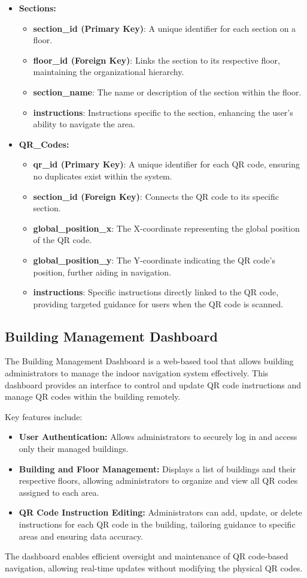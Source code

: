 \begin{itemize}
	\item \textbf{Sections:}  
	\begin{itemize}
		\item \textbf{section\_id (Primary Key)}: A unique identifier for each section on a floor.
		\item \textbf{floor\_id (Foreign Key)}: Links the section to its respective floor, maintaining the organizational hierarchy.
		\item \textbf{section\_name}: The name or description of the section within the floor.
		\item \textbf{instructions}: Instructions specific to the section, enhancing the user’s ability to navigate the area.
	\end{itemize}
	
	\item \textbf{QR\_Codes:}  
	\begin{itemize}
		\item \textbf{qr\_id (Primary Key)}: A unique identifier for each QR code, ensuring no duplicates exist within the system.
		\item \textbf{section\_id (Foreign Key)}: Connects the QR code to its specific section.
		\item \textbf{global\_position\_x}: The X-coordinate representing the global position of the QR code.
		\item \textbf{global\_position\_y}: The Y-coordinate indicating the QR code's position, further aiding in navigation.
		\item \textbf{instructions}: Specific instructions directly linked to the QR code, providing targeted guidance for users when the QR code is scanned.
	\end{itemize}
\end{itemize}


\subsection{Building Management Dashboard}

The Building Management Dashboard is a web-based tool that allows building administrators to manage the indoor navigation system effectively. This dashboard provides an interface to control and update QR code instructions and manage QR codes within the building remotely.

Key features include:
\begin{itemize}
	\item \textbf{User Authentication:} Allows administrators to securely log in and access only their managed buildings.
	\item \textbf{Building and Floor Management:} Displays a list of buildings and their respective floors, allowing administrators to organize and view all QR codes assigned to each area.
	\item \textbf{QR Code Instruction Editing:} Administrators can add, update, or delete instructions for each QR code in the building, tailoring guidance to specific areas and ensuring data accuracy.
\end{itemize}

The dashboard enables efficient oversight and maintenance of QR code-based navigation, allowing real-time updates without modifying the physical QR codes.